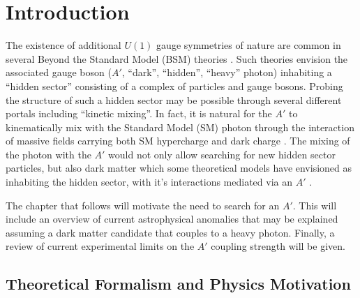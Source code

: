 \chapter{Introduction}

The existence of additional $U(1)$ gauge symmetries of nature are common in
several Beyond the Standard Model (BSM) theories \cite{goodsell2010, 
candelas1985, andreas2013, jaeckel2010}. Such theories envision the associated
gauge boson ($A'$, ``dark'', ``hidden'', ``heavy'' photon) inhabiting a 
``hidden sector''
consisting of a complex of particles and gauge bosons.  Probing the 
structure of such a hidden sector may be possible through several different portals
including ``kinetic mixing''.  In fact, it is natural for the $A'$ to 
kinematically mix with the Standard Model (SM) photon through the interaction
of massive fields carrying both SM hypercharge and dark charge \cite{holdom1986}.
The mixing of the photon with the $A'$ would not only allow searching for
new hidden sector particles, but also dark matter which some theoretical models
have envisioned as inhabiting the hidden sector, with it's interactions mediated
via an $A'$ \cite{arkani-hamed2009, pospelov2009, cheung2009, arkani-hamed2008}.

The chapter that follows will motivate the need to search for an $A'$.  
This will include an overview of current astrophysical anomalies
that may be explained assuming a dark matter candidate that couples to a 
heavy photon.  Finally, a review of current experimental limits on the $A'$ 
coupling strength will be given.

\section{Theoretical Formalism and Physics Motivation}

